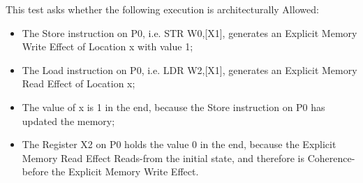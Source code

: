 This test asks whether the following execution is architecturally Allowed:

\begin{itemize}
  \item The Store instruction on P0, i.e. STR W0,[X1], generates an Explicit Memory Write Effect of Location x with value 1;
  \item The Load instruction on P0, i.e. LDR W2,[X1], generates an Explicit Memory Read Effect of Location x;
  \item The value of x is 1 in the end, because the Store instruction on P0 has updated the memory;
  \item The Register X2 on P0 holds the value 0 in the end, because the Explicit Memory Read Effect Reads-from the initial state, and therefore is Coherence-before the Explicit Memory Write Effect.
\end{itemize}
